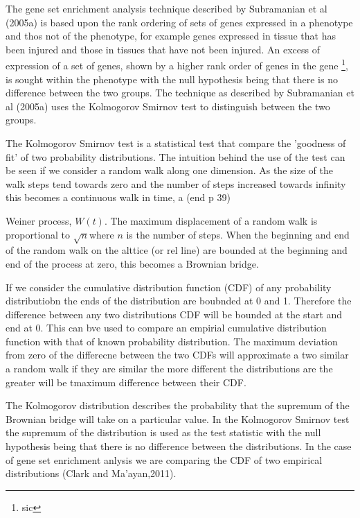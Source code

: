 The gene set enrichment analysis technique described by Subramanian et al (2005a) is based upon the rank ordering of sets of genes expressed in a phenotype and thos not of the phenotype, for example genes expressed in tissue that has been injured and those in tissues that have not been injured. An excess of expression of a set of genes, shown by a higher rank order of genes in the gene \footnote{sic}, is sought within the phenotype with the null hypothesis being that there is no difference between the two groups. The technique as described by Subramanian et al (2005a) uses the Kolmogorov Smirnov test to distinguish between the two groups. 

The Kolmogorov Smirnov test is a statistical test that compare the 'goodness of fit' of two probability distributions. The intuition behind the use of the test can be seen if we consider a random walk along one dimension. As the size of the walk steps tend towards zero and the number of steps increased towards infinity this becomes a continuous walk in time, a (end p 39)

Weiner process, $W(t)$. The maximum displacement of a random walk is proportional to $\sqrt{n}$where $n$ is the number of steps. When the beginning and end of the random walk on the alttice (or rel line) are bounded at the beginning and end of the process at zero, this becomes a Brownian bridge.

If we consider the cumulative distribution function (CDF) of any probability distributiobn the ends of the distribution are boubnded at 0 and 1. Therefore the difference between any two distributions CDF will be bounded at the start and end at 0. This can bve used to compare an empirial cumulative distribution function with that of known probability distribution. The maximum deviation from zero of the differecne between the two CDFs will approximate a two similar a random walk if they are similar the more different the distributions are the greater will be tmaximum difference between their CDF.

The Kolmogorov distribution describes the probability that the supremum of the Brownian bridge will take on a particular value. In the Kolmogorov Smirnov test the supremum of the distribution is used as the test statistic with the null hypothesis being that there is no difference between the distributions. In the case of gene set enrichment anlysis we are comparing the CDF of two empirical distributions (Clark and Ma'ayan,2011).

